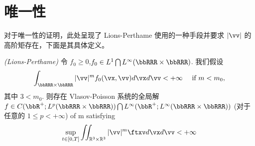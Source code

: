 \section{唯一性}


对于唯一性的证明，此处呈现了 Lions-Perthame 使用的一种手段并要求 $|\vv|$ 的高阶矩存在，下面是其具体定义。
\begin{theorem}\textit{(Lions-Perthame)}
    令 $f_0\geq 0$,$f_0\in L^1\bigcap L^\infty (\bbRRR\times \bbRRR)$. 我们假设  
    \begin{equation}
        \int_{\bbRRR \times \bbRRR}|\vv|^{m} f_{0}(\vx, \vv) d \vx d \vv<+\infty \quad \text { if } m<m_{0},
    \end{equation}
    其中 $3<m_0$. 则存在 Vlasov-Poisson 系统的全局解 $f\in C(\bbR^+; L^p(\bbRRR\times\bbRRR))\bigcap L^\infty (\bbR^+;L^\infty(\bbRRR\times \bbRRR))$ (对于任意的 $1\leq p < +\infty$) of m satisfying 
    \begin{equation}
    \sup _{t \in[0, T]} \iint_{ \mathbb{R}^{3} \times \mathbb{R}^{3}}|\vv|^{m} \ftxv d \vx d \vv<+\infty
    \end{equation}
\end{theorem}


    







